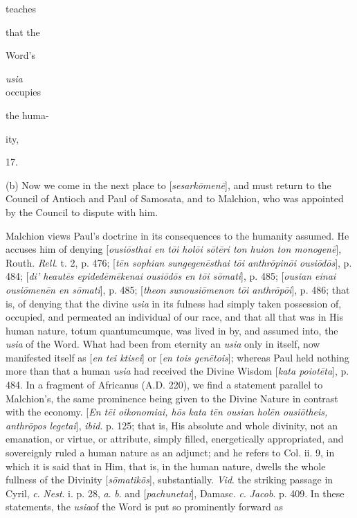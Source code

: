 teaches

that the

Word's

\emph{usia}\\
occupies

the huma-

ity,

17.

(b) Now we come in
the next place to [\emph{sesark\={o}men\={e}}], and must
return to the Council of Antioch and Paul of Samosata, and to
Malchion, who was appointed by the Council to dispute with
him.

Malchion views
Paul's doctrine in its consequences to the humanity assumed.
He accuses him of denying [\emph{ousi\={o}sthai en t\={o}i
hol\={o}i s\={o}t\={e}ri ton huion ton monogen\={e}}],
Routh. \emph{Rell}. t. 2, p. 476; [\emph{t\={e}n sophian
sungegen\={e}sthai t\={o}i anthr\={o}pin\={o}i
ousi\={o}d\={o}s}], p. 484; [\emph{di' heaut\={e}s
epided\={e}m\={e}kenai ousi\={o}d\={o}s en t\={o}i
s\={o}mati}], p. 485; [\emph{ousian einai ousi\={o}men\={e}n
en s\={o}mati}], p. 485; [\emph{theon sunousi\={o}menon
t\={o}i anthr\={o}p\={o}i}], p. 486; that is, of
denying that the divine \emph{usia} in its fulness had simply
taken possession of, occupied, and permeated an individual of
our race, and that all that was in His human nature, totum
quantumcumque, was lived in by, and assumed into, the \emph{usia}
of the Word. What had been from eternity an \emph{usia} only
in itself, now manifested itself as [\emph{en tei ktisei}] or
[\emph{en tois gen\={e}tois}]; whereas Paul held nothing
more than that a human \emph{usia} had received the Divine
Wisdom [\emph{kata poiot\={e}ta}], p. 484. In a fragment of
Africanus (A.D.
220), we find a statement parallel to Malchion's, the same
prominence being given to the Divine Nature in contrast with
the economy. [\emph{En t\={e}i oikonomiai, h\={o}s kata t\={e}n
ousian hol\={e}n ousi\={o}theis, anthr\={o}pos
legetai}], \emph{ibid}. p. 125; that is, His absolute
and whole divinity, not an emanation, or virtue, or attribute,
simply filled, energetically appropriated, and sovereignly
ruled a human nature as an adjunct; and he refers to Col. ii.
9, in which it is said that in Him, that is, in the human nature,
dwells the whole fullness of the Divinity [\emph{s\={o}matik\={o}s}],
substantially. \emph{Vid}. the striking passage in Cyril, \emph{c}.
\emph{Nest}. i. p. 28, \emph{a}. \emph{b}. and [\emph{pachunetai}],
Damasc. \emph{c}. \emph{Jacob}. p. 409. In these statements,
the \emph{usia}of the Word is put so prominently forward as
